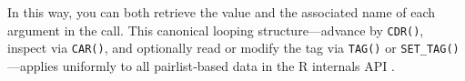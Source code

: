 In this way, you can both retrieve the value and the associated name of each argument in the call.  This canonical looping structure—advance by \texttt{CDR()}, inspect via \texttt{CAR()}, and optionally read or modify the tag via \texttt{TAG()} or \texttt{SET\_TAG()}—applies uniformly to all pairlist‐based data in the R internals API \cite{wickham_pairlists}.
